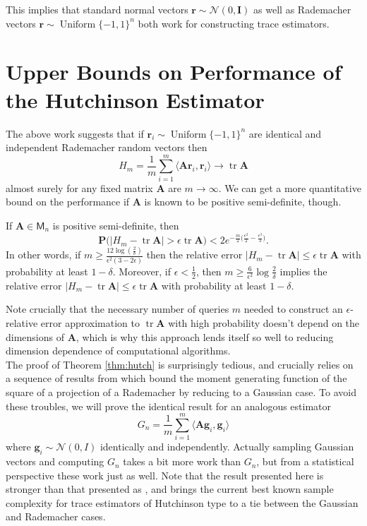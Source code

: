 \documentclass[10pt,letterpaper]{siamart171218}
\theoremstyle{definition}
\theoremstyle{remark}
\newcommand\inner[1]{\langle #1 \rangle}
\newcommand\M{\mathsf{M}}
\renewcommand\P{\mathbf{P}}
\newcommand\tr{\operatorname{tr}}
\newcommand\A{\boldsymbol{A}}
\newcommand\I{\boldsymbol{I}}
\newcommand\g{\boldsymbol{g}}
\renewcommand\r{\boldsymbol{r}}
\begin{document}
This implies that standard normal vectors
$\r \sim\mathcal{N}(0,\I)$ as well as Rademacher vectors
$\r \sim \operatorname{Uniform}\{-1,1\}^n$ both work for
constructing trace estimators.

\section{Upper Bounds on Performance of the Hutchinson Estimator}

The above work suggests that if
\(
    \r_i \sim\operatorname{Uniform}\{-1,1\}^n
\)
are identical and independent Rademacher random vectors then
\[
    H_m = \frac{1}{m}\sum_{i=1}^m \inner{\A\r_i,\r_i} \to \tr\A
\]
almost surely for any fixed matrix $\A$ are $m\to\infty$. We can get a
more quantitative bound on the performance if $\A$ is known to be positive
semi-definite, though.

\begin{theorem}\label{thm:hutch}
    If $\A\in\M_n$ is positive semi-definite, then
    \[
        \P\bigl(|H_m - \tr\A| > \epsilon\tr\A\bigr) < 2e^{-\tfrac{m}{2}\bigl(\tfrac{\epsilon^2}{2} - \tfrac{\epsilon^3}{3}\bigr)}.
    \]
    In other words, if $m \geq \tfrac{12\log(\tfrac{2}{\delta})}{\epsilon^2(3-2\epsilon)}$ then
    the relative error $|H_m - \tr\A| \leq \epsilon\tr\A$ with probability at least $1-\delta$.
    Moreover, if $\epsilon < \tfrac{1}{2}$, then $m \geq \tfrac{6}{\epsilon^2}\log\tfrac{2}{\delta}$
    implies the relative error $|H_m - \tr\A| \leq \epsilon\tr\A$ with probability at least $1-\delta$.
\end{theorem}

Note crucially that the necessary number of queries $m$ needed to construct an
$\epsilon$-relative error approximation to $\tr\A$ with high probability doesn't depend
on the dimensions of $\A$, which is why this approach lends itself so well
to reducing dimension dependence of computational algorithms.\\

The proof of Theorem \ref{thm:hutch} is surprisingly tedious, and crucially relies on a sequence of
results from \cite{achlioptas2001database} which bound the moment generating function of the square of a projection
of a Rademacher by reducing to a Gaussian case. To avoid these troubles, we will prove the identical result for an
analogous estimator
\[
    G_n = \frac{1}{m}\sum_{i=1}^m \inner{\A\g_i,\g_i}
\]
where $\g_i \sim \mathcal{N}(0,I)$ identically and independently. Actually sampling Gaussian
vectors and computing $G_n$ takes a bit more work than $G_n$, but from a statistical perspective
these work just as well. Note that the result presented here is stronger than
that presented as \citep[Thm\,3]{roosta2015improved}, and brings the current best known
sample complexity for trace estimators of Hutchinson type to a tie between the Gaussian
and Rademacher cases.
\end{document}
